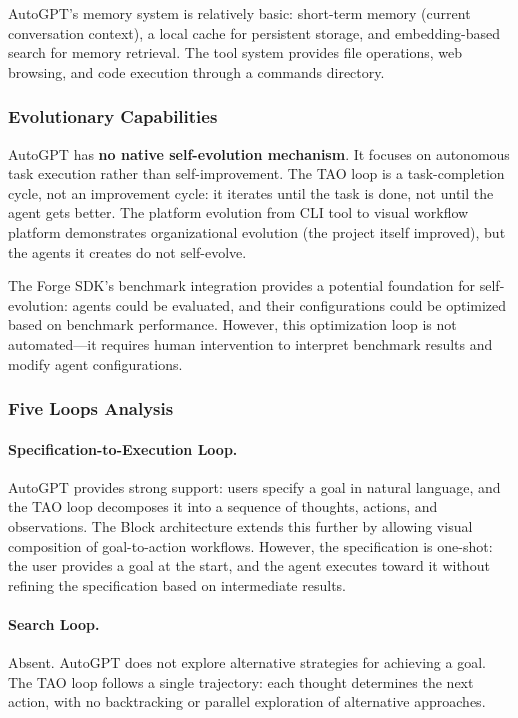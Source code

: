AutoGPT's memory system is relatively basic: short-term memory (current conversation context), a local cache for persistent storage, and embedding-based search for memory retrieval. The tool system provides file operations, web browsing, and code execution through a commands directory.

\subsubsection{Evolutionary Capabilities}

AutoGPT has \textbf{no native self-evolution mechanism}. It focuses on autonomous task execution rather than self-improvement. The TAO loop is a task-completion cycle, not an improvement cycle: it iterates until the task is done, not until the agent gets better. The platform evolution from CLI tool to visual workflow platform demonstrates organizational evolution (the project itself improved), but the agents it creates do not self-evolve.

The Forge SDK's benchmark integration provides a potential foundation for self-evolution: agents could be evaluated, and their configurations could be optimized based on benchmark performance. However, this optimization loop is not automated---it requires human intervention to interpret benchmark results and modify agent configurations.

\subsubsection{Five Loops Analysis}

\paragraph{Specification-to-Execution Loop.}
AutoGPT provides strong support: users specify a goal in natural language, and the TAO loop decomposes it into a sequence of thoughts, actions, and observations. The Block architecture extends this further by allowing visual composition of goal-to-action workflows. However, the specification is one-shot: the user provides a goal at the start, and the agent executes toward it without refining the specification based on intermediate results.

\paragraph{Search Loop.}
Absent. AutoGPT does not explore alternative strategies for achieving a goal. The TAO loop follows a single trajectory: each thought determines the next action, with no backtracking or parallel exploration of alternative approaches.

